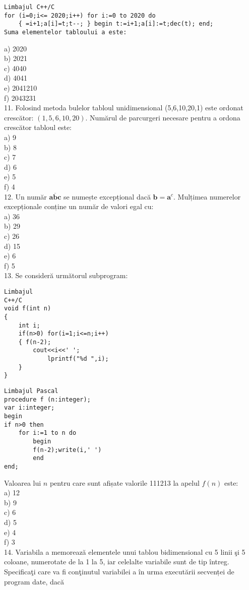 \begin{verbatim}
Limbajul C++/C
for (i=0;i<= 2020;i++) for i:=0 to 2020 do
    { =i+1;a[i]=t;t--; } begin t:=i+1;a[i]:=t;dec(t); end;
Suma elementelor tabloului a este:
\end{verbatim}

a) 2020\\
b) 2021\\
c) 4040\\
d) 4041\\
e) 2041210\\
f) 2043231\\
11. Folosind metoda bulelor tabloul unidimensional (5,6,10,20,1) este ordonat crescător: $(1,5,6,10,20)$. Numărul de parcurgeri necesare pentru a ordona crescător tabloul este:\\
a) 9\\
b) 8\\
c) 7\\
d) 6\\
e) 5\\
f) 4\\
12. Un număr $\overline{\mathbf{a b c}}$ se numește excepțional dacă $\mathbf{b}=\mathbf{a}^{c}$. Mulțimea numerelor excepționale conține un număr de valori egal cu:\\
a) 36\\
b) 29\\
c) 26\\
d) 15\\
e) 6\\
f) 5\\
13. Se consideră următorul subprogram:

\begin{verbatim}
Limbajul
C++/C
void f(int n)
{
    int i;
    if(n>0) for(i=1;i<=n;i++)
    { f(n-2);
        cout<<i<<' ';
            lprintf("%d ",i);
    }
}
\end{verbatim}

\begin{verbatim}
Limbajul Pascal
procedure f (n:integer);
var i:integer;
begin
if n>0 then
    for i:=1 to n do
        begin
        f(n-2);write(i,' ')
        end
end;
\end{verbatim}

Valoarea lui $n$ pentru care sunt afișate valorile 111213 la apelul $f(n)$ este:\\
a) 12\\
b) 9\\
c) 6\\
d) 5\\
e) 4\\
f) 3\\
14. Variabila a memorează elementele unui tablou bidimensional cu 5 linii şi 5 coloane, numerotate de la 1 la 5, iar celelalte variabile sunt de tip întreg. Specificaţi care va fi conţinutul variabilei a în urma executării secvenței de program date, dacă

